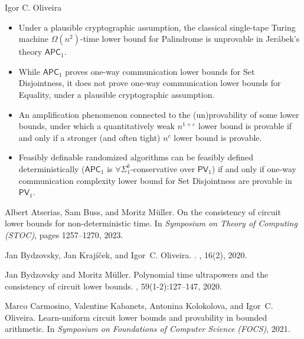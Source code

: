 \documentclass[report]{owrart}
\begin{document}
\begin{report}
\begin{talk}{Igor C. Oliveira}
\begin{itemize}
    \item Under a plausible cryptographic assumption, the classical single-tape Turing machine $\Omega(n^2)$-time lower bound for Palindrome is unprovable in Jerábek’s theory $\mathsf{APC}_1$.
    \item While $\mathsf{APC}_1$ proves one-way communication lower bounds for Set Disjointness, it does not prove one-way communication lower bounds for Equality, under a plausible cryptographic assumption.
    \item An amplification phenomenon connected to the (un)provability of some lower bounds, under which a quantitatively weak $n^{1 + \varepsilon}$ lower bound is provable if and only if a stronger (and often tight) $n^c$ lower bound is provable.
    \item Feasibly definable randomized algorithms can be feasibly defined deterministically ($\mathsf{APC}_1$ is $\forall\Sigma^b_1$-conservative over $\mathsf{PV}_1$) if and only if one-way communication complexity lower bound for Set Disjointness are provable in $\mathsf{PV}_1$.
\end{itemize}
    
    \begin{thebibliography}{99}
    
        Albert Atserias, Sam Buss, and Moritz M{\"{u}}ller.
        \newblock On the consistency of circuit lower bounds for non-deterministic
          time.
        \newblock In {\em Symposium on Theory of Computing \emph{(STOC)}}, pages
          1257--1270, 2023.
        
        Jan Bydzovsky, Jan Kraj{\'{i}}{\v{c}}ek, and Igor~C. Oliveira.
        .
        , 16(2), 2020.
        
        Jan Bydzovsky and Moritz M{\"{u}}ller.
        \newblock Polynomial time ultrapowers and the consistency of circuit lower
          bounds.
        , 59(1-2):127--147, 2020.
        
        Marco Carmosino, Valentine Kabanets, Antonina Kolokolova, and Igor~C. Oliveira.
        \newblock Learn-uniform circuit lower bounds and provability in bounded
          arithmetic.
        \newblock In {\em Symposium on Foundations of Computer Science \emph{(FOCS)}},
          2021.
        

\end{thebibliography}
\end{talk}
\end{report}
\end{document}
